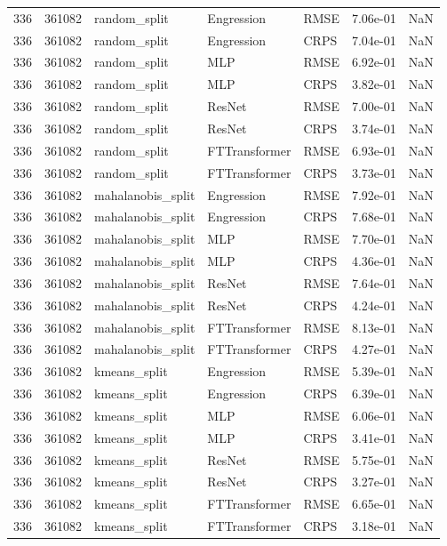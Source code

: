 \begin{tabular}{rrlllrr}
336 & 361082 & random\_split & Engression & RMSE & 7.06e-01 & NaN \\
336 & 361082 & random\_split & Engression & CRPS & 7.04e-01 & NaN \\
336 & 361082 & random\_split & MLP & RMSE & 6.92e-01 & NaN \\
336 & 361082 & random\_split & MLP & CRPS & 3.82e-01 & NaN \\
336 & 361082 & random\_split & ResNet & RMSE & 7.00e-01 & NaN \\
336 & 361082 & random\_split & ResNet & CRPS & 3.74e-01 & NaN \\
336 & 361082 & random\_split & FTTransformer & RMSE & 6.93e-01 & NaN \\
336 & 361082 & random\_split & FTTransformer & CRPS & 3.73e-01 & NaN \\
336 & 361082 & mahalanobis\_split & Engression & RMSE & 7.92e-01 & NaN \\
336 & 361082 & mahalanobis\_split & Engression & CRPS & 7.68e-01 & NaN \\
336 & 361082 & mahalanobis\_split & MLP & RMSE & 7.70e-01 & NaN \\
336 & 361082 & mahalanobis\_split & MLP & CRPS & 4.36e-01 & NaN \\
336 & 361082 & mahalanobis\_split & ResNet & RMSE & 7.64e-01 & NaN \\
336 & 361082 & mahalanobis\_split & ResNet & CRPS & 4.24e-01 & NaN \\
336 & 361082 & mahalanobis\_split & FTTransformer & RMSE & 8.13e-01 & NaN \\
336 & 361082 & mahalanobis\_split & FTTransformer & CRPS & 4.27e-01 & NaN \\
336 & 361082 & kmeans\_split & Engression & RMSE & 5.39e-01 & NaN \\
336 & 361082 & kmeans\_split & Engression & CRPS & 6.39e-01 & NaN \\
336 & 361082 & kmeans\_split & MLP & RMSE & 6.06e-01 & NaN \\
336 & 361082 & kmeans\_split & MLP & CRPS & 3.41e-01 & NaN \\
336 & 361082 & kmeans\_split & ResNet & RMSE & 5.75e-01 & NaN \\
336 & 361082 & kmeans\_split & ResNet & CRPS & 3.27e-01 & NaN \\
336 & 361082 & kmeans\_split & FTTransformer & RMSE & 6.65e-01 & NaN \\
336 & 361082 & kmeans\_split & FTTransformer & CRPS & 3.18e-01 & NaN \\

\end{tabular}
